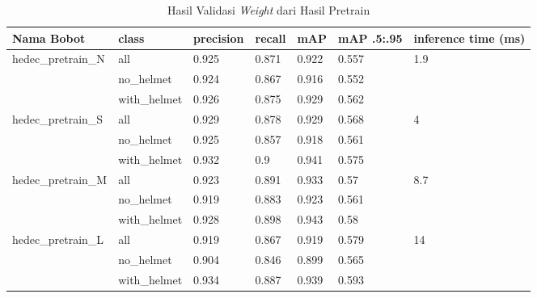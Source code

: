 \begin{table}[ht]
  \centering
  \caption{Hasil Validasi \emph{Weight} dari Hasil Pretrain}
  \label{tb:pretraincoco}
  \begin{tabular}{|l|l|l|l|l|l|l|} 
  \hline
  Nama Bobot                          & class        & precision & recall & mAP   & mAP .5:.95 & inference time (ms)    \\ 
  \hline
  \multirow{3}{*}{hedec\_pretrain\_N} & all          & 0.925     & 0.871  & 0.922 & 0.557      & \multirow{3}{*}{1.9}   \\
                                      & no\_helmet   & 0.924     & 0.867  & 0.916 & 0.552      &                        \\
                                      & with\_helmet & 0.926     & 0.875  & 0.929 & 0.562      &                        \\ 
  \hline
  \multirow{3}{*}{hedec\_pretrain\_S} & all          & 0.929     & 0.878  & 0.929 & 0.568      & \multirow{3}{*}{4}     \\
                                      & no\_helmet   & 0.925     & 0.857  & 0.918 & 0.561      &                        \\
                                      & with\_helmet & 0.932     & 0.9    & 0.941 & 0.575      &                        \\ 
  \hline
  \multirow{3}{*}{hedec\_pretrain\_M} & all          & 0.923     & 0.891  & 0.933 & 0.57       & \multirow{3}{*}{8.7}   \\
                                      & no\_helmet   & 0.919     & 0.883  & 0.923 & 0.561      &                        \\
                                      & with\_helmet & 0.928     & 0.898  & 0.943 & 0.58       &                        \\ 
  \hline
  \multirow{3}{*}{hedec\_pretrain\_L} & all          & 0.919     & 0.867  & 0.919 & 0.579      & \multirow{3}{*}{14}    \\
                                      & no\_helmet   & 0.904     & 0.846  & 0.899 & 0.565      &                        \\
                                      & with\_helmet & 0.934     & 0.887  & 0.939 & 0.593      &                        \\ 
  \hline
  \end{tabular}
\end{table}


